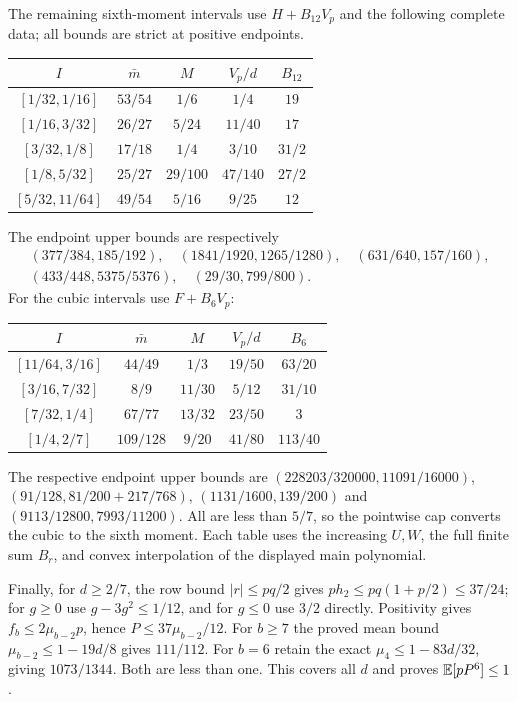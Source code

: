 The remaining sixth-moment intervals use $H+B_{12}V_p$ and the following
complete data; all bounds are strict at positive endpoints.
\begin{center}\small
\begin{tabular}{@{}ccccc@{}}\toprule
$I$&$\bar m$&$M$&$V_p/d$&$B_{12}$\\\midrule
$[1/32,1/16]$&$53/54$&$1/6$&$1/4$&$19$\\
$[1/16,3/32]$&$26/27$&$5/24$&$11/40$&$17$\\
$[3/32,1/8]$&$17/18$&$1/4$&$3/10$&$31/2$\\
$[1/8,5/32]$&$25/27$&$29/100$&$47/140$&$27/2$\\
$[5/32,11/64]$&$49/54$&$5/16$&$9/25$&$12$\\\bottomrule
\end{tabular}
\end{center}
The endpoint upper bounds are respectively
\begin{gather*}
 (377/384,185/192),\quad(1841/1920,1265/1280),\quad
 (631/640,157/160),\\
 (433/448,5375/5376),\quad(29/30,799/800).
\end{gather*}
For the cubic intervals use $F+B_6V_p$:
\begin{center}\small
\begin{tabular}{@{}ccccc@{}}\toprule
$I$&$\bar m$&$M$&$V_p/d$&$B_6$\\\midrule
$[11/64,3/16]$&$44/49$&$1/3$&$19/50$&$63/20$\\
$[3/16,7/32]$&$8/9$&$11/30$&$5/12$&$31/10$\\
$[7/32,1/4]$&$67/77$&$13/32$&$23/50$&$3$\\
$[1/4,2/7]$&$109/128$&$9/20$&$41/80$&$113/40$\\\bottomrule
\end{tabular}
\end{center}
The respective endpoint upper bounds are
$(228203/320000,11091/16000)$,
$(91/128,81/200+217/768)$,
$(1131/1600,139/200)$ and $(9113/12800,7993/11200)$.
All are less than $5/7$, so the pointwise cap converts the cubic to the
sixth moment. Each table uses the increasing $U,W$, the full finite sum
$B_r$, and convex interpolation of the displayed main polynomial.

Finally, for $d\ge2/7$, the row bound $|r|\le pq/2$ gives
$ph_2\le pq(1+p/2)\le37/24$; for $g\ge0$ use $g-3g^2\le1/12$,
and for $g\le0$ use $3/2$ directly.
Positivity gives $f_b\le2\mu_{b-2}p$, hence $P\le37\mu_{b-2}/12$.
For $b\ge7$ the proved mean bound $\mu_{b-2}\le1-19d/8$ gives $111/112$.
For $b=6$ retain the exact $\mu_4\le1-83d/32$, giving $1073/1344$.
Both are less than one. This covers all $d$ and proves $\mathbb E[pP^6]\le1$.
